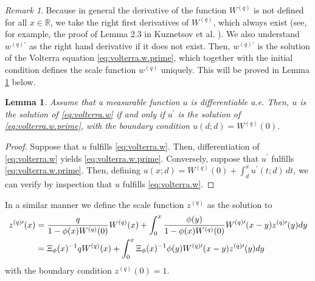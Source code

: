 \documentclass[12pt,reqno]{amsart}
\newcommand{\red}{\textcolor[rgb]{1.00,0.00,0.00}}
\newcommand{\blue}{\textcolor[rgb]{0.00,0.00,1.00}}
\newtheorem{lemma}[theorem]{Lemma}
\theoremstyle{definition}
\theoremstyle{remark}
\newtheorem{remark}[theorem]{Remark}
\begin{document}
\begin{remark}\label{derivatives}
Because in general the derivative of the function $W^{(q)}$ is not defined for all $x\in\mathbb{R}$, we take the right first derivatives of $W^{(q)}$, 
which always exist (see, for example, the proof of Lemma 2.3 in Kuznetsov et al. \cite{kuznetsovetal2012}).
We also understand $w^{(q)\prime}$ as the right hand derivative if it does not exist. Then, $w^{(q)\prime}$ is the solution of the Volterra equation \eqref{eq:volterra.w.prime},
 which together with the initial condition defines the scale function $w^{(q)}$ uniquely. This will be proved in Lemma \ref{lem:u.uprime} below.
\end{remark}

  \begin{lemma}\label{lem:u.uprime}
  Assume that a measurable function $u$ is differentiable a.e. Then, $u$ is the solution of \eqref{eq:volterra.w} if and only if $u^{\prime}$ is the solution of  \eqref{eq:volterra.w.prime}, with  the boundary condition $u(d;d)=W^{(q)}(0)$.
  \end{lemma}

\begin{proof}
Suppose that $u$ fulfills  \eqref{eq:volterra.w}. Then, differentiation of 
 \eqref{eq:volterra.w} yields  \eqref{eq:volterra.w.prime}. Conversely, suppose that $u^{\prime}$ fulfills
\eqref{eq:volterra.w.prime}. Then, defining $u(x;d)=W^{(q)}(0)+\int_d^x u^{\prime}(t;d)\,dt$, we can verify by inspection that
$u$ fulfills  \eqref{eq:volterra.w}.
\end{proof}

In a similar manner we define the scale function $z^{(q)}$ as the solution to
\begin{align}\label{eq:volterra.z.prime}\notag
  z^{(q)\prime}(x)&=\frac{q}{1-\phi(x)W^{(q)}(0)}W^{(q)}(x)+\int_0^x \frac{\phi(y)}{1-\phi(x)W^{(q)}(0)} {W^{(q)\prime}}(x-y)z^{(q)\prime}(y)dy\\
	&=\Xi_{\phi}(x)^{-1}qW^{(q)}(x)+ \int_0^x \Xi_{\phi}(x)^{-1} \phi(y) W^{(q)\prime}(x-y){z^{(q)\prime}}(y)dy 
\end{align}
with the boundary condition $z^{(q)}(0) = 1$.
\end{document}
